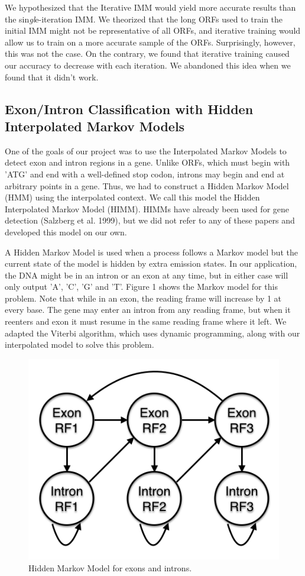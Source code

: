 \documentclass[11pt,letterpaper]{article}
\begin{document}
We hypothesized that the Iterative IMM would yield more accurate results than the sin\textit{gl}e-iteration IMM. We theorized that the long ORFs used to train the initial IMM might not be representative of all ORFs, and iterative training would allow us to train on a more accurate sample of the ORFs. Surprisingly, however, this was not the case. On the contrary, we found that iterative training caused our accuracy to decrease with each iteration. We abandoned this idea when we found that it didn't work.


\subsection{Exon/Intron Classification with Hidden Interpolated Markov Models}
One of the goals of our project was to use the Interpolated Markov Models to detect exon and intron regions in a gene. Unlike ORFs, which must begin with 'ATG' and end with a well-defined stop codon, introns may begin and end at arbitrary points in a gene. Thus, we had to construct a Hidden Markov Model (HMM) using the interpolated context. We call this model the Hidden Interpolated Markov Model (HIMM). HIMMs have already been used for gene detection (Salzberg et al. 1999), but we did not refer to any of these papers and developed this model on our own.

A Hidden Markov Model is used when a process follows a Markov model but the current state of the model is hidden by extra emission states. In our application, the DNA might be in an intron or an exon at any time, but in either case will only output 'A', 'C', 'G' and 'T'. Figure 1 shows the Markov model for this problem. Note that while in an exon, the reading frame will increase by 1 at every base. The gene may enter an intron from any reading frame, but when it reenters and exon it must resume in the same reading frame where it left. We adapted the Viterbi algorithm, which uses dynamic programming, along with our interpolated model to solve this problem.

\begin{figure}
	\begin{center}
		\includegraphics[scale=0.4]{HMM.png}
	\end{center}
	\caption{\label{font-table} Hidden Markov Model for exons and introns.}
\end{figure}
\end{document}
